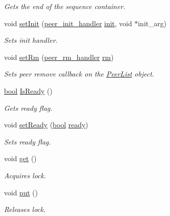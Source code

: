 \begin{DoxyCompactItemize}
\begin{DoxyCompactList}\small\item\em Gets the end of the sequence container. \end{DoxyCompactList}\item 
void \hyperlink{class_peer_list_ac9ba92c486ceb213c15b0e8fdea963f4}{set\+Init} (\hyperlink{_peer_list_8hpp_a08d52dcdc07d2bec302be1b8e2718c8f}{peer\+\_\+init\+\_\+handler} \hyperlink{class_peer_list_a16f86d3255eb28f02dcaf5768e203b62}{init}, void $\ast$init\+\_\+arg)
\begin{DoxyCompactList}\small\item\em Sets init handler. \end{DoxyCompactList}\item 
void \hyperlink{class_peer_list_a914a8eb9ee0bdc2b8c03911671a41625}{set\+Rm} (\hyperlink{_peer_list_8hpp_a276ac0f57f4dc8f2b64efa93ccb167c2}{peer\+\_\+rm\+\_\+handler} \hyperlink{class_peer_list_a9958b92a85d1751a7bdfac8c5fd4ea96}{rm})
\begin{DoxyCompactList}\small\item\em Sets peer remove callback on the \hyperlink{class_peer_list}{Peer\+List} object. \end{DoxyCompactList}\item 
\hyperlink{avb__gptp_8h_af6a258d8f3ee5206d682d799316314b1}{bool} \hyperlink{class_peer_list_a6a5257615fcc122ba0dfbfde6c8a80e5}{Is\+Ready} ()
\begin{DoxyCompactList}\small\item\em Gets ready flag. \end{DoxyCompactList}\item 
void \hyperlink{class_peer_list_afc31074bae05a5b224593091da17e149}{set\+Ready} (\hyperlink{avb__gptp_8h_af6a258d8f3ee5206d682d799316314b1}{bool} \hyperlink{class_peer_list_a65cf7d7f8e531611b245355ab91fd749}{ready})
\begin{DoxyCompactList}\small\item\em Sets ready flag. \end{DoxyCompactList}\item 
void \hyperlink{class_lockable_a5a8046fd4b22dbe2b30ef4d18c5ac64e}{get} ()
\begin{DoxyCompactList}\small\item\em Acquires lock. \end{DoxyCompactList}\item 
void \hyperlink{class_lockable_a760567729cc565fd13d414937a558a89}{put} ()
\begin{DoxyCompactList}\small\item\em Releases lock. \end{DoxyCompactList}\end{DoxyCompactItemize}
